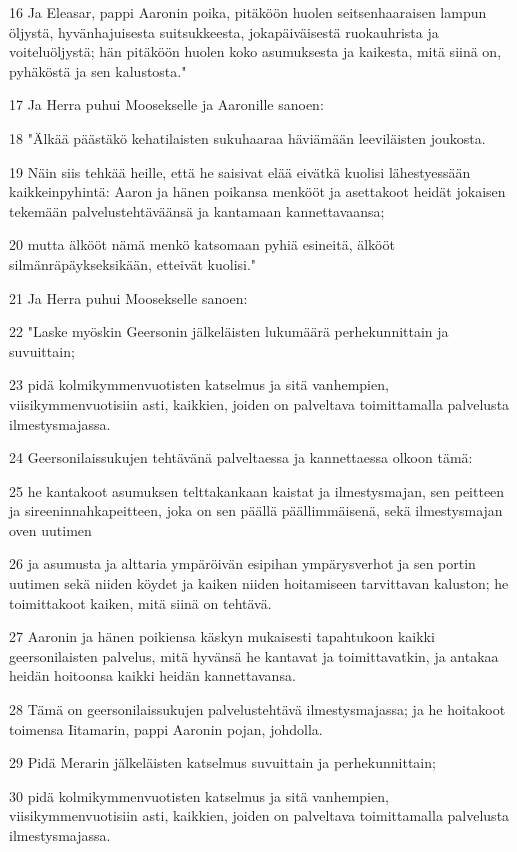 \par 16 Ja Eleasar, pappi Aaronin poika, pitäköön huolen seitsenhaaraisen lampun öljystä, hyvänhajuisesta suitsukkeesta, jokapäiväisestä ruokauhrista ja voiteluöljystä; hän pitäköön huolen koko asumuksesta ja kaikesta, mitä siinä on, pyhäköstä ja sen kalustosta."
\par 17 Ja Herra puhui Moosekselle ja Aaronille sanoen:
\par 18 "Älkää päästäkö kehatilaisten sukuhaaraa häviämään leeviläisten joukosta.
\par 19 Näin siis tehkää heille, että he saisivat elää eivätkä kuolisi lähestyessään kaikkeinpyhintä: Aaron ja hänen poikansa menkööt ja asettakoot heidät jokaisen tekemään palvelustehtäväänsä ja kantamaan kannettavaansa;
\par 20 mutta älkööt nämä menkö katsomaan pyhiä esineitä, älkööt silmänräpäykseksikään, etteivät kuolisi."
\par 21 Ja Herra puhui Moosekselle sanoen:
\par 22 "Laske myöskin Geersonin jälkeläisten lukumäärä perhekunnittain ja suvuittain;
\par 23 pidä kolmikymmenvuotisten katselmus ja sitä vanhempien, viisikymmenvuotisiin asti, kaikkien, joiden on palveltava toimittamalla palvelusta ilmestysmajassa.
\par 24 Geersonilaissukujen tehtävänä palveltaessa ja kannettaessa olkoon tämä:
\par 25 he kantakoot asumuksen telttakankaan kaistat ja ilmestysmajan, sen peitteen ja sireeninnahkapeitteen, joka on sen päällä päällimmäisenä, sekä ilmestysmajan oven uutimen
\par 26 ja asumusta ja alttaria ympäröivän esipihan ympärysverhot ja sen portin uutimen sekä niiden köydet ja kaiken niiden hoitamiseen tarvittavan kaluston; he toimittakoot kaiken, mitä siinä on tehtävä.
\par 27 Aaronin ja hänen poikiensa käskyn mukaisesti tapahtukoon kaikki geersonilaisten palvelus, mitä hyvänsä he kantavat ja toimittavatkin, ja antakaa heidän hoitoonsa kaikki heidän kannettavansa.
\par 28 Tämä on geersonilaissukujen palvelustehtävä ilmestysmajassa; ja he hoitakoot toimensa Iitamarin, pappi Aaronin pojan, johdolla.
\par 29 Pidä Merarin jälkeläisten katselmus suvuittain ja perhekunnittain;
\par 30 pidä kolmikymmenvuotisten katselmus ja sitä vanhempien, viisikymmenvuotisiin asti, kaikkien, joiden on palveltava toimittamalla palvelusta ilmestysmajassa.
